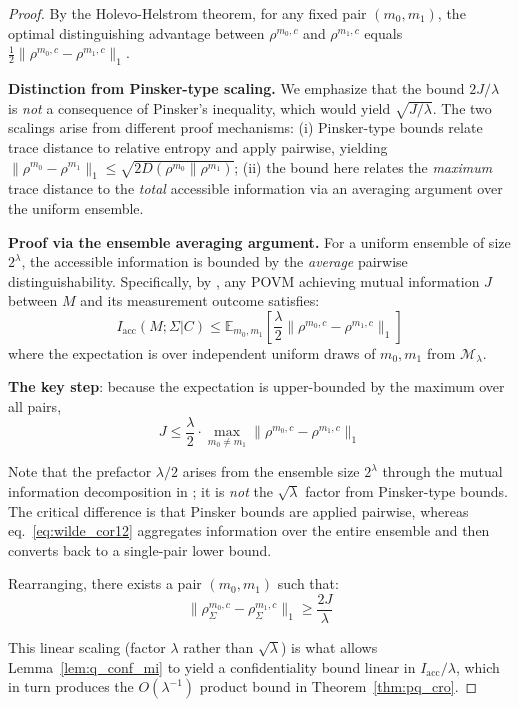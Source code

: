 \documentclass{ieeeaccess}
\begin{document}
\begin{proof}
By the Holevo-Helstrom theorem, for any fixed pair $(m_0, m_1)$, 
the optimal distinguishing advantage between $\rho^{m_0,c}$ and 
$\rho^{m_1,c}$ equals $\frac{1}{2}\|\rho^{m_0,c} - \rho^{m_1,c}\|_1$.

\textbf{Distinction from Pinsker-type scaling.}
We emphasize that the bound $2J/\lambda$ is \emph{not} a consequence 
of Pinsker's inequality, which would yield $\sqrt{J/\lambda}$. 
The two scalings arise from different proof mechanisms:
(i) Pinsker-type bounds relate trace distance to relative entropy 
    and apply pairwise, yielding $\|\rho^{m_0}-\rho^{m_1}\|_1 
    \leq \sqrt{2D(\rho^{m_0}\|\rho^{m_1})}$;
(ii) the bound here relates the \emph{maximum} trace distance 
    to the \emph{total} accessible information via an averaging 
    argument over the uniform ensemble.

\textbf{Proof via the ensemble averaging argument.}
For a uniform ensemble of size $2^\lambda$, the accessible information
is bounded by the \emph{average} pairwise distinguishability.
Specifically, by \cite[Corollary~12.1]{Wilde2017}, any POVM 
achieving mutual information $J$ between $M$ and its measurement 
outcome satisfies:
\begin{equation}
    I_{\mathrm{acc}}(M;\Sigma|C) \leq 
    \mathbb{E}_{m_0,m_1}\!\left[\frac{\lambda}{2}
    \|\rho^{m_0,c} - \rho^{m_1,c}\|_1\right]
    \label{eq:wilde_cor12}
\end{equation}
where the expectation is over independent uniform draws of 
$m_0, m_1$ from $\mathcal{M}_\lambda$.

\textbf{The key step}: because the expectation is upper-bounded 
by the maximum over all pairs,
\begin{equation}
    J \leq \frac{\lambda}{2} \cdot 
    \max_{m_0 \neq m_1}\|\rho^{m_0,c} - \rho^{m_1,c}\|_1
\end{equation}

Note that the prefactor $\lambda/2$ arises from the ensemble size 
$2^\lambda$ through the mutual information decomposition in 
\cite[Corollary~12.1]{Wilde2017}; it is \emph{not} the 
$\sqrt{\lambda}$ factor from Pinsker-type bounds. The critical 
difference is that Pinsker bounds are applied pairwise, whereas 
eq.~\eqref{eq:wilde_cor12} aggregates information over the entire 
ensemble and then converts back to a single-pair lower bound.

Rearranging, there exists a pair $(m_0, m_1)$ such that:
\begin{equation}
    \|\rho_\Sigma^{m_0,c} - \rho_\Sigma^{m_1,c}\|_1 \geq \frac{2J}{\lambda}
\end{equation}

This linear scaling (factor $\lambda$ rather than $\sqrt{\lambda}$) 
is what allows Lemma~\ref{lem:q_conf_mi} to yield a confidentiality 
bound linear in $I_{\mathrm{acc}}/\lambda$, which in turn produces 
the $O(\lambda^{-1})$ product bound in Theorem~\ref{thm:pq_cro}.
\end{proof}
\end{document}
